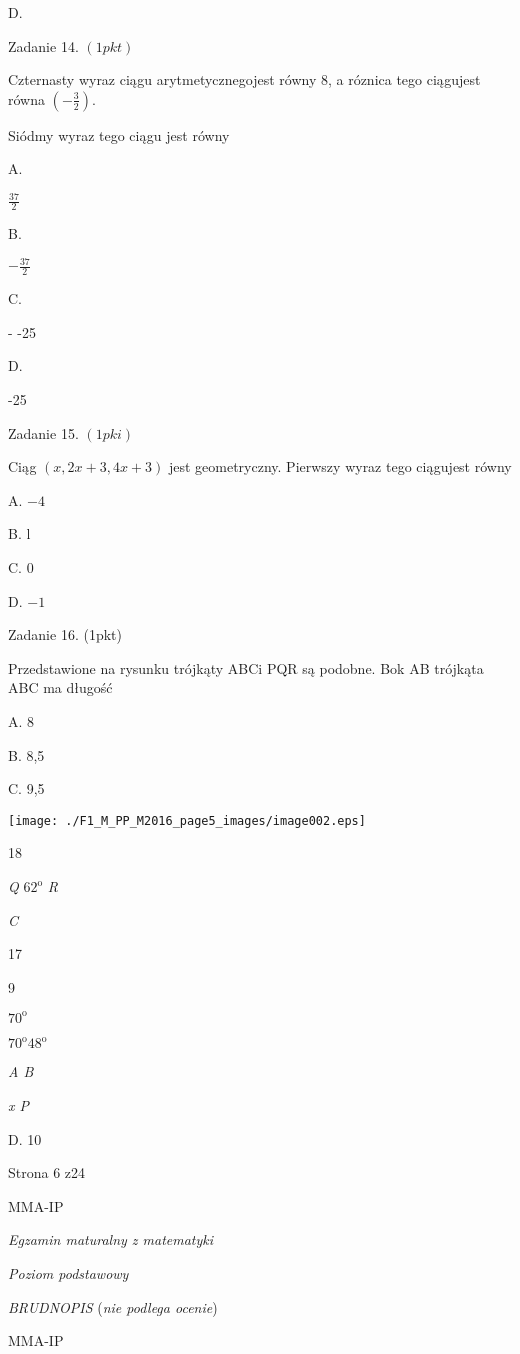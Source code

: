 \documentclass[a4paper,12pt]{article}
\begin{document}
D.

Zadanie 14. $(1pkt)$

Czternasty wyraz ciągu arytmetycznegojest równy 8, a róznica tego ciągujest równa $(-\displaystyle \frac{3}{2}).$

Siódmy wyraz tego ciągu jest równy

A.

$\displaystyle \frac{37}{2}$

B.

$-\displaystyle \frac{37}{2}$

C.

- -25

D.

-25

Zadanie 15. $(1pki)$

Ciąg $(x,2x+3,4x+3)$ jest geometryczny. Pierwszy wyraz tego ciągujest równy

A. $-4$

B. l

C. 0

D. $-1$

Zadanie 16. (1pkt)

Przedstawione na rysunku trójkąty ABCi PQR są podobne. Bok AB trójkąta ABC ma długość

A. 8

B. 8,5

C. 9,5
\begin{center}
\texttt{[image: ./F1\_M\_PP\_M2016\_page5\_images/image002.eps]}
\end{center}
18

{\it Q}  $62^{\mathrm{o}}$  {\it R}

{\it C}

17

9

$70^{\mathrm{o}}$

$70^{\mathrm{o}}  48^{\mathrm{o}}$

{\it A B}

{\it x  P}

D. 10

Strona 6 z24

MMA-IP





{\it Egzamin maturalny z matematyki}

{\it Poziom podstawowy}

{\it BRUDNOPIS} ({\it nie podlega ocenie})

MMA-IP
\end{document}

